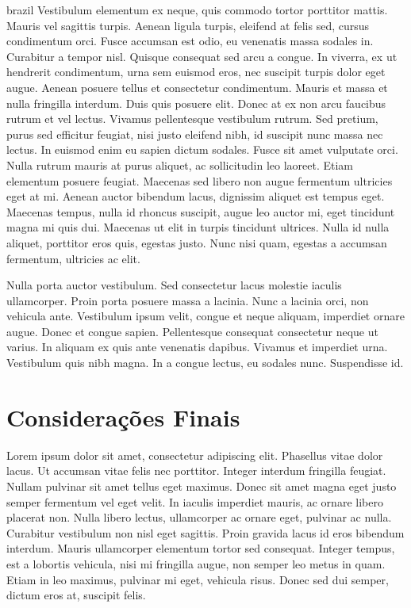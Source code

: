 \begin{otherlanguage*}{brazil}
    Vestibulum elementum ex neque, quis commodo tortor porttitor mattis.
    Mauris vel sagittis turpis. Aenean ligula turpis, eleifend at felis sed,
    cursus condimentum orci. Fusce accumsan est odio, eu venenatis massa
    sodales in. Curabitur a tempor nisl. Quisque consequat sed arcu a
    congue. In viverra, ex ut hendrerit condimentum, urna sem euismod eros,
    nec suscipit turpis dolor eget augue. Aenean posuere tellus et
    consectetur condimentum. Mauris et massa et nulla fringilla interdum.
    Duis quis posuere elit. Donec at ex non arcu faucibus rutrum et vel
    lectus. Vivamus pellentesque vestibulum rutrum. Sed pretium, purus sed
    efficitur feugiat, nisi justo eleifend nibh, id suscipit nunc massa nec
    lectus. In euismod enim eu sapien dictum sodales. Fusce sit amet
    vulputate orci. Nulla rutrum mauris at purus aliquet, ac sollicitudin
    leo laoreet. Etiam elementum posuere feugiat. Maecenas sed libero non
    augue fermentum ultricies eget at mi. Aenean auctor bibendum lacus,
    dignissim aliquet est tempus eget. Maecenas tempus, nulla id rhoncus
    suscipit, augue leo auctor mi, eget tincidunt magna mi quis dui.
    Maecenas ut elit in turpis tincidunt ultrices. Nulla id nulla aliquet,
    porttitor eros quis, egestas justo. Nunc nisi quam, egestas a accumsan
    fermentum, ultricies ac elit.

    Nulla porta auctor vestibulum. Sed consectetur lacus molestie iaculis
    ullamcorper. Proin porta posuere massa a lacinia. Nunc a lacinia orci,
    non vehicula ante. Vestibulum ipsum velit, congue et neque aliquam,
    imperdiet ornare augue. Donec et congue sapien. Pellentesque consequat
    consectetur neque ut varius. In aliquam ex quis ante venenatis dapibus.
    Vivamus et imperdiet urna. Vestibulum quis nibh magna. In a congue
    lectus, eu sodales nunc. Suspendisse id.

    \section*{Considerações Finais}
    Lorem ipsum dolor sit amet, consectetur adipiscing elit. Phasellus vitae
    dolor lacus. Ut accumsan vitae felis nec porttitor. Integer interdum
    fringilla feugiat. Nullam pulvinar sit amet tellus eget maximus. Donec
    sit amet magna eget justo semper fermentum vel eget velit.  In iaculis
    imperdiet mauris, ac ornare libero placerat non. Nulla libero lectus,
    ullamcorper ac ornare eget, pulvinar ac nulla. Curabitur vestibulum non
    nisl eget sagittis. Proin gravida lacus id eros bibendum interdum.
    Mauris ullamcorper elementum tortor sed consequat.  Integer tempus, est
    a lobortis vehicula, nisi mi fringilla augue, non semper leo metus in
    quam. Etiam in leo maximus, pulvinar mi eget, vehicula risus. Donec sed
    dui semper, dictum eros at, suscipit felis.


\end{otherlanguage*}
